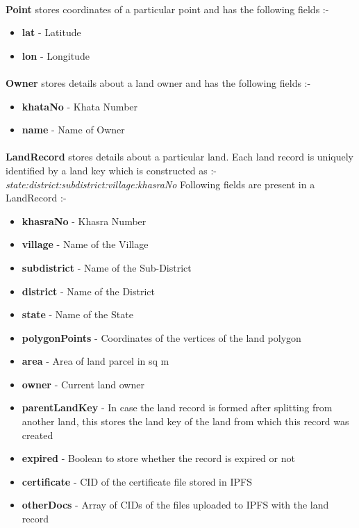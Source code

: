 \documentclass{article}
\begin{document}
        \paragraph{}
        \textbf{Point} stores coordinates of a particular point and has the following fields :-
        \begin{itemize}
            \item \textbf{lat} - Latitude
            \item \textbf{lon} - Longitude
        \end{itemize}

        \paragraph{}
        \textbf{Owner} stores details about a land owner and has the following fields :-
        \begin{itemize}
            \item \textbf{khataNo} - Khata Number
            \item \textbf{name} - Name of Owner
        \end{itemize}

        \paragraph{}
        \textbf{LandRecord} stores details about a particular land. Each land record is uniquely identified by a land key which is constructed as :-
        \textit{state:district:subdistrict:village:khasraNo}
        Following fields are present in a LandRecord :-
        \begin{itemize}
            \item \textbf{khasraNo} - Khasra Number
            \item \textbf{village} - Name of the Village
            \item \textbf{subdistrict} - Name of the Sub-District
            \item \textbf{district} - Name of the District
            \item \textbf{state} - Name of the State
            \item \textbf{polygonPoints} - Coordinates of the vertices of the land polygon
            \item \textbf{area} - Area of land parcel in sq m
            \item \textbf{owner} - Current land owner
            \item \textbf{parentLandKey} - In case the land record is formed after splitting from another land, this stores the land key of the land from which this record was created
            \item \textbf{expired} - Boolean to store whether the record is expired or not
            \item \textbf{certificate} - CID of the certificate file stored in IPFS
            \item \textbf{otherDocs} - Array of CIDs of the files uploaded to IPFS with the land record
        \end{itemize}
\end{document}
